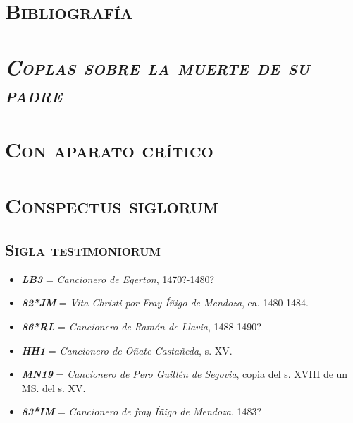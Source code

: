 \documentclass[11pt,twoside]{article}
\newcommand{\eg}{{\emph{\textbf{LB3}}}}
\newcommand{\jm}{\emph{\textbf{82*JM}}}
\newcommand{\rl}{\emph{\textbf{86*RL}}}
\newcommand{\hh}{\emph{\textbf{HH1}}}
\newcommand{\mn}{\emph{\textbf{MN19}}}
\newcommand{\im}{\emph{\textbf{83*IM}}}
\newcommand{\head}[1]{\def\mihead{#1}\thispagestyle{empty}} \def\mihead{} \newpagestyle{editio}{\sethead[\thepage][\ifx\mihead\empty\else\mihead\fi][]{}{\ifx\mihead\empty\else\mihead\fi}{\thepage}} \pagestyle{editio}
\begin{document}
\section*{\centering\textsc{Bibliografía}}
\nocite{*}
\printbibliography[heading=none]
\newpage
%
\head{}
\section*{\centering\huge\textsc{\emph{Coplas sobre la muerte de su padre}}}
%
\section*{\centering\textsc{Con aparato crítico}}
\newpage
%
\setcounter{page}{8}
\section*{\centering\textsc{Conspectus siglorum}}
%
\subsection*{\normalsize\textsc{Sigla testimoniorum}}
\vspace*{-2.5pt}
\begin{itemize}[label=,leftmargin=0.6cm]%
\item {\eg} = \emph{Cancionero de Egerton}, 1470?-1480?
\item {\jm} = \emph{Vita Christi por Fray Íñigo de Mendoza}, ca. 1480-1484.
\item {\rl} = \emph{Cancionero de Ramón de Llavia}, 1488-1490?
\item {\hh} = \emph{Cancionero de Oñate-Castañeda}, s. XV.
\item {\mn} = \emph{Cancionero de Pero Guillén de Segovia}, copia del s. XVIII de un MS. del s. XV.
\item {\im} = \emph{Cancionero de fray Íñigo de Mendoza}, 1483?%
\end{itemize}
%
\end{document}
